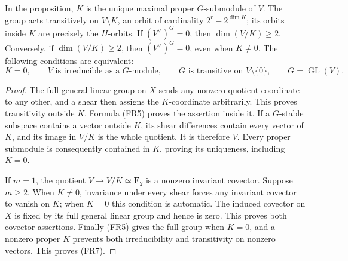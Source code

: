 \begin{corollary}
\label{cor:root-full-radical-submodules-orbits}
In the proposition, \(K\) is the unique maximal proper
\(G\)-submodule of \(V\). The group acts transitively on
\(V\setminus K\), an orbit of cardinality
\(2^r-2^{\dim K}\); its orbits inside \(K\) are precisely
the \(H\)-orbits. If \((V^\vee)^G=0\), then
\(\dim(V/K)\geq2\). Conversely, if \(\dim(V/K)\geq2\),
then \((V^\vee)^G=0\), even when \(K\ne0\).
The following conditions are equivalent:
\[
 K=0,\qquad V\text{ is irreducible as a }G\text{-module},
 \qquad G\text{ is transitive on }V\setminus\{0\},
 \qquad G=\operatorname{GL}(V).
 \tag{FR7}
\]
\end{corollary}
\begin{proof}
The full general linear group on \(X\) sends any nonzero
quotient coordinate to any other, and a shear then assigns
the \(K\)-coordinate arbitrarily. This proves transitivity
outside \(K\). Formula (FR5) proves the assertion inside it.
If a \(G\)-stable subspace contains a vector outside \(K\),
its shear differences contain every vector of \(K\), and
its image in \(V/K\) is the whole quotient. It is therefore
\(V\). Every proper submodule is consequently contained in
\(K\), proving its uniqueness, including \(K=0\).

If \(m=1\), the quotient \(V\to V/K\simeq\mathbf F_2\)
is a nonzero invariant covector. Suppose \(m\geq2\).
When \(K\ne0\), invariance under every shear forces any
invariant covector to vanish on \(K\); when \(K=0\) this
condition is automatic. The induced covector on \(X\) is
fixed by its full general linear group and hence is zero.
This proves both covector assertions. Finally (FR5) gives
the full group when \(K=0\), and a nonzero proper \(K\)
prevents both irreducibility and transitivity on nonzero
vectors. This proves (FR7).
\end{proof}

